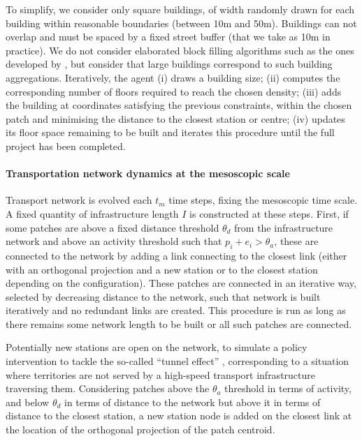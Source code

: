 \documentclass[letterpaper]{article}
\begin{document}
To simplify, we consider only square buildings, of width randomly drawn for each building within reasonable boundaries (between 10m and 50m). Buildings can not overlap and must be spaced by a fixed street buffer (that we take as 10m in practice). We do not consider elaborated block filling algorithms such as the ones developed by \cite{brasebin2017apports}, but consider that large buildings correspond to such building aggregations. Iteratively, the agent (i) draws a building size; (ii) computes the corresponding number of floors required to reach the chosen density; (iii) adds the building at coordinates satisfying the previous constraints, within the chosen patch and minimising the distance to the closest station or centre; (iv) updates its floor space remaining to be built and iterates this procedure until the full project has been completed.


\paragraph{Transportation network dynamics at the mesoscopic scale}

Transport network is evolved each $t_m$ time steps, fixing the mesoscopic time scale. A fixed quantity of infrastructure length $I$ is constructed at these steps. First, if some patches are above a fixed distance threshold $\theta_d$ from the infrastructure network and above an activity threshold such that $p_i + e_i > \theta_a$, these are connected to the network by adding a link connecting to the closest link (either with an orthogonal projection and a new station or to the closest station depending on the configuration). These patches are connected in an iterative way, selected by decreasing distance to the network, such that network is built iteratively and no redundant links are created. This procedure is run as long as there remains some network length to be built or all such patches are connected.

Potentially new stations are open on the network, to simulate a policy intervention to tackle the so-called ``tunnel effect'' \citep{gonzalez2019long}, corresponding to a situation where territories are not served by a high-speed transport infrastructure traversing them. Considering patches above the $\theta_a$ threshold in terms of activity, and below $\theta_d$ in terms of distance to the network but above it in terms of distance to the closest station, a new station node is added on the closest link at the location of the orthogonal projection of the patch centroid.
\end{document}
